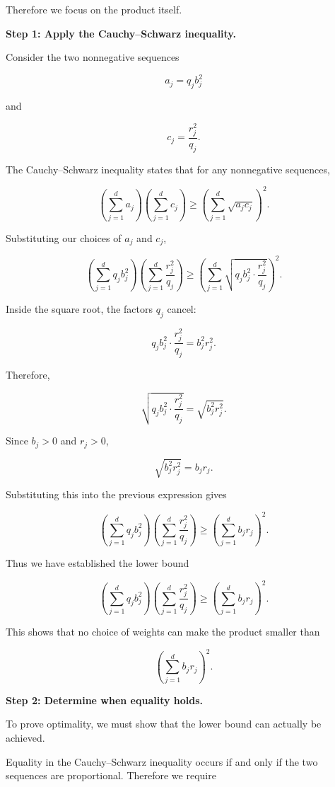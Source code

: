 \documentclass[11pt]{article}
\begin{document}
\begin{enumerate}
\begin{solutionbox}
Therefore we focus on the product itself.

\medskip

\textbf{Step 1: Apply the Cauchy--Schwarz inequality.}

Consider the two nonnegative sequences

\[
a_j=q_j b_j^2
\]

and

\[
c_j=\frac{r_j^2}{q_j}.
\]

The Cauchy--Schwarz inequality states that for any nonnegative sequences,

\[
\left(\sum_{j=1}^{d} a_j\right)
\left(\sum_{j=1}^{d} c_j\right)
\ge
\left(
\sum_{j=1}^{d}
\sqrt{a_jc_j}
\right)^2.
\]

Substituting our choices of \(a_j\) and \(c_j\),

\[
\left(
\sum_{j=1}^{d}
q_j b_j^2
\right)
\left(
\sum_{j=1}^{d}
\frac{r_j^2}{q_j}
\right)
\ge
\left(
\sum_{j=1}^{d}
\sqrt{
q_j b_j^2
\cdot
\frac{r_j^2}{q_j}
}
\right)^2.
\]

Inside the square root, the factors \(q_j\) cancel:

\[
q_j b_j^2
\cdot
\frac{r_j^2}{q_j}
=
b_j^2 r_j^2.
\]

Therefore,

\[
\sqrt{
q_j b_j^2
\cdot
\frac{r_j^2}{q_j}
}
=
\sqrt{b_j^2r_j^2}.
\]

Since \(b_j>0\) and \(r_j>0\),

\[
\sqrt{b_j^2r_j^2}
=
b_jr_j.
\]

Substituting this into the previous expression gives

\[
\left(
\sum_{j=1}^{d}
q_j b_j^2
\right)
\left(
\sum_{j=1}^{d}
\frac{r_j^2}{q_j}
\right)
\ge
\left(
\sum_{j=1}^{d}
b_jr_j
\right)^2.
\]

Thus we have established the lower bound

\[
\boxed{
\left(
\sum_{j=1}^{d}
q_j b_j^2
\right)
\left(
\sum_{j=1}^{d}
\frac{r_j^2}{q_j}
\right)
\ge
\left(
\sum_{j=1}^{d}
b_jr_j
\right)^2.
}
\]

This shows that no choice of weights can make the product smaller than

\[
\left(
\sum_{j=1}^{d}
b_jr_j
\right)^2.
\]

\medskip

\textbf{Step 2: Determine when equality holds.}

To prove optimality, we must show that the lower bound can actually be achieved.

Equality in the Cauchy--Schwarz inequality occurs if and only if the two sequences are proportional. Therefore we require


\end{solutionbox}
\end{enumerate}
\end{document}
